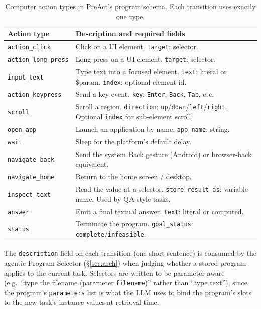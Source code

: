 \documentclass[11pt]{article}
\begin{document}
\begin{table}[h]
\centering
\caption{Computer action types in PreAct's program schema. Each transition uses exactly one type.}
\label{tab:actions}
\small
\begin{tabular}{@{}lp{8.5cm}@{}}
\toprule
Action type & Description and required fields \\
\midrule
\texttt{action\_click} & Click on a UI element. \texttt{target}: selector. \\
\texttt{action\_long\_press} & Long-press on a UI element. \texttt{target}: selector. \\
\texttt{input\_text} & Type text into a focused element. \texttt{text}: literal or \$param. \texttt{index}: optional element id. \\
\texttt{action\_keypress} & Send a key event. \texttt{key}: \texttt{Enter}, \texttt{Back}, \texttt{Tab}, etc. \\
\texttt{scroll} & Scroll a region. \texttt{direction}: \texttt{up}/\texttt{down}/\texttt{left}/\texttt{right}. Optional \texttt{index} for sub-element scroll. \\
\texttt{open\_app} & Launch an application by name. \texttt{app\_name}: string. \\
\texttt{wait} & Sleep for the platform's default delay. \\
\texttt{navigate\_back} & Send the system Back gesture (Android) or browser-back equivalent. \\
\texttt{navigate\_home} & Return to the home screen / desktop. \\
\texttt{inspect\_text} & Read the value at a selector. \texttt{store\_result\_as}: variable name. Used by QA-style tasks. \\
\texttt{answer} & Emit a final textual answer. \texttt{text}: literal or computed. \\
\texttt{status} & Terminate the program. \texttt{goal\_status}: \texttt{complete}/\texttt{infeasible}. \\
\bottomrule
\end{tabular}
\end{table}

The \texttt{description} field on each transition (one short sentence) is consumed by the agentic Program Selector (\S\ref{sec:arch}) when judging whether a stored program applies to the current task. Selectors are written to be parameter-aware (e.g.\ ``type the filename (parameter \texttt{filename})'' rather than ``type text''), since the program's \texttt{parameters} list is what the LLM uses to bind the program's slots to the new task's instance values at retrieval time.
\end{document}

